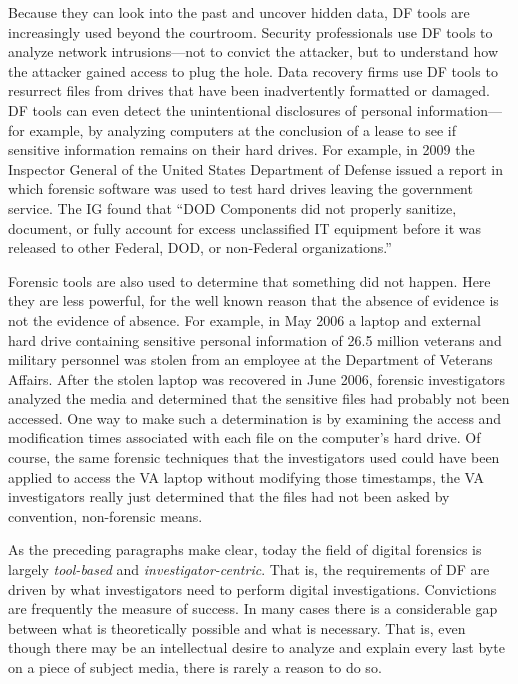 Because they can look into the past and uncover hidden data,
DF tools are increasingly used beyond the courtroom. Security
professionals use DF tools to analyze network intrusions---not
to convict the attacker, but to understand how the
attacker gained access to plug the hole. Data recovery firms use DF tools to resurrect files from drives that have
been inadvertently formatted or damaged. DF tools can even 
detect the  unintentional disclosures of personal information---for
example, by analyzing computers at the conclusion of a lease to see if
sensitive information remains on their hard drives. For example, in
2009 the Inspector General of the United States Department of Defense
issued a report in which forensic software was used to test hard
drives leaving the government service. The IG found that ``DOD Components did not properly
sanitize, document, or fully account for excess unclassified IT
equipment before it was released to other Federal, DOD, or non-Federal
organizations.''\cite{D-2009-104}

Forensic tools are also used to determine that something did not
happen. Here they are less powerful, for the well known reason that
the absence of evidence is not the evidence of absence. 
For example, in May 2006 a laptop and external hard drive containing
sensitive personal information of 26.5 million veterans and military
personnel was stolen from an employee at the Department of Veterans
Affairs. After the stolen laptop was recovered in June 2006, forensic
investigators analyzed the media and determined that the sensitive
files had probably not been accessed\cite{va-laptop-1}. One way to
make such a determination is by examining the access and modification
times associated with each file on the computer's hard
drive. Of course, the same
forensic techniques that the investigators used could have been
applied to access the VA laptop without modifying those timestamps,
the VA investigators really just determined that the files had not
been asked by convention, non-forensic means.

As the preceding paragraphs make clear, today the field of digital
forensics is largely \emph{tool-based} and
\emph{investigator-centric}. 
That is, the requirements of DF are driven 
by what investigators need to perform digital
investigations\citep{walls-levine-effective-digital-forensics}. Convictions
are frequently the
measure of success. In many cases there is a considerable gap between
what is theoretically possible and what is necessary. That is, even
though there may be an intellectual desire to analyze and explain every last byte
on a piece of subject media\cite{garfinkel:every-last-byte}, there is
rarely a reason to do so.

